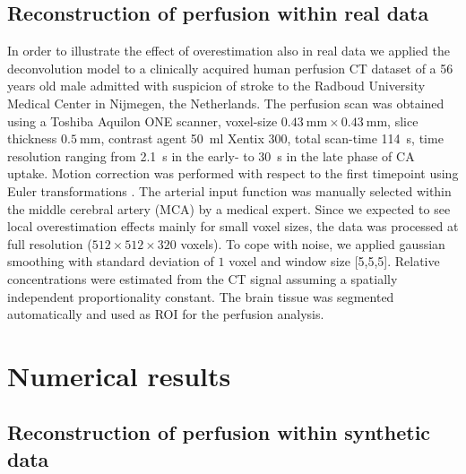 \documentclass[aps,prb,article,groupedaddress,showkeys]{revtex4}
\begin{document}
	\subsection{Reconstruction of perfusion within real data}\label{sec:RealData}
	In order to illustrate the effect of overestimation also in real data we applied the deconvolution model to a clinically acquired human perfusion CT dataset of a 56 years old male admitted with suspicion of stroke to the Radboud University Medical Center in Nijmegen, the Netherlands.
	The perfusion scan was obtained using a Toshiba Aquilon ONE scanner, voxel-size $\SI{0.43}{\milli\meter}\times\SI{0.43}{\milli\meter}$, slice thickness $\SI{0.5}{\milli\meter}$, contrast agent \SI{50}{\milli\litre} Xentix 300, total scan-time \SI{114}{\second}, time resolution ranging from \SI{2.1}{\second} in the early- to \SI{30}{\second} in the late phase of CA uptake.
	Motion correction was performed with respect to the first timepoint using Euler transformations \cite{Mendrik11}.
	The arterial input function was manually selected within the middle cerebral artery (MCA) by a medical expert.
	Since we expected to see local overestimation effects mainly for small voxel sizes, the data was processed at full resolution ($512\times512\times320$ voxels). 
	To cope with noise, we applied gaussian smoothing with standard deviation of $1$ voxel and window size [5,5,5].
	Relative concentrations were estimated from the CT signal assuming a spatially independent proportionality constant. 
	The brain tissue was segmented automatically and used as ROI for the perfusion analysis.


	\section{Numerical results}	
	\subsection{Reconstruction of perfusion within synthetic data}\label{sec:RecPhantom}
\end{document}
